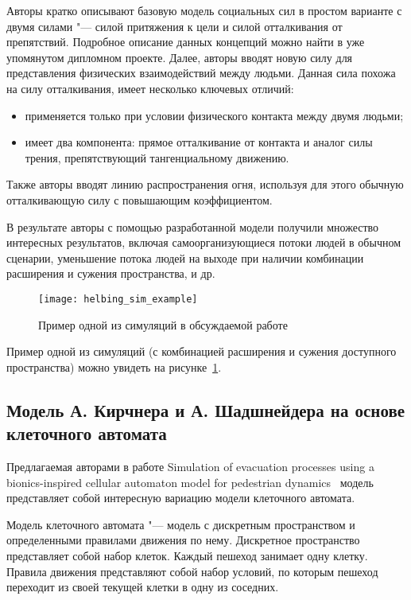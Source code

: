 Авторы кратко описывают базовую модель социальных сил в простом варианте с двумя силами "--- силой притяжения к цели и силой отталкивания от препятствий.
Подробное описание данных концепций можно найти в уже упомянутом дипломном проекте.
Далее, авторы вводят новую силу для представления физических взаимодействий между людьми.
Данная сила похожа на силу отталкивания, имеет несколько ключевых отличий:

\begin{itemize}
  \item применяется только при условии физического контакта между двумя людьми;
  \item имеет два компонента: прямое отталкивание от контакта и аналог силы трения, препятствующий тангенциальному движению.
\end{itemize}

Также авторы вводят линию распространения огня, используя для этого обычную отталкивающую силу с повышающим коэффициентом.

В результате авторы с помощью разработанной модели получили множество интересных результатов, включая самоорганизующиеся потоки людей в обычном сценарии,
уменьшение потока людей на выходе при наличии комбинации расширения и сужения пространства, и др.

\begin{figure}[ht!]
  \texttt{[image: helbing\_sim\_example]}
  \caption{Пример одной из симуляций в обсуждаемой работе}
  \label{sub:overview:helbing:sim_example}
\end{figure}

Пример одной из симуляций (с комбинацией расширения и сужения доступного пространства) можно увидеть на рисунке~\ref{sub:overview:helbing:sim_example}.


\subsection{Модель А. Кирчнера и А. Шадшнейдера на основе клеточного автомата}
\label{sub:overview:kirchner}

Предлагаемая авторами в работе Simulation of evacuation processes using a bionics-inspired cellular automaton model for pedestrian dynamics~\cite{kirchner2002simulation} модель представляет собой интересную вариацию модели клеточного автомата.

Модель клеточного автомата "--- модель с дискретным пространством и определенными правилами движения по нему.
Дискретное пространство представляет собой набор клеток. Каждый пешеход занимает одну клетку.
Правила движения представляют собой набор условий, по которым пешеход переходит из своей текущей клетки в одну из соседних.

